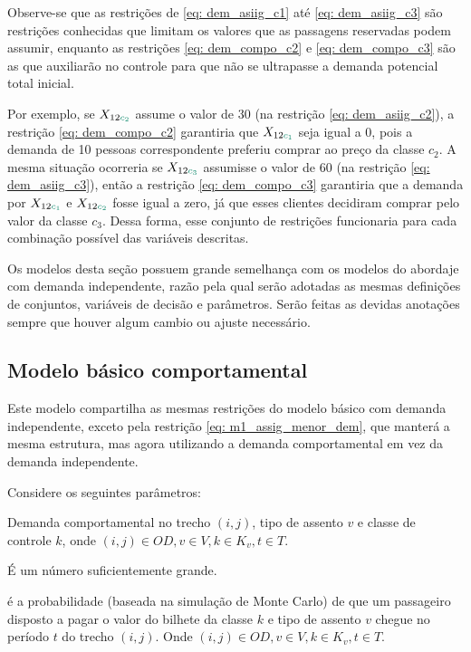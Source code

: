 Observe-se que as restrições de \eqref{eq: dem_asiig_c1} até \eqref{eq: dem_asiig_c3} são restrições conhecidas que limitam os valores que as passagens reservadas podem assumir, enquanto as restrições \eqref{eq: dem_compo_c2} e \eqref{eq: dem_compo_c3} são as que auxiliarão no controle para que não se ultrapasse a demanda potencial total inicial.

Por exemplo, se $X_{12\textcolor[rgb]{0.0588, 0.5412, 0.4275}{c_2}}$ assume o valor de 30 (na restrição \ref{eq: dem_asiig_c2}), a restrição \eqref{eq: dem_compo_c2} garantiria que $X_{12\textcolor[rgb]{0.0588, 0.5412, 0.4275}{c_1}}$ seja igual a 0, pois a demanda de 10 pessoas correspondente preferiu comprar ao preço da classe $c_2$. A mesma situação ocorreria se $X_{12\textcolor[rgb]{0.0588, 0.5412, 0.4275}{c_3}}$ assumisse o valor de 60 (na restrição \ref{eq: dem_asiig_c3}), então a restrição \eqref{eq: dem_compo_c3} garantiria que a demanda por $X_{12\textcolor[rgb]{0.0588, 0.5412, 0.4275}{c_1}}$ e $X_{12\textcolor[rgb]{0.0588, 0.5412, 0.4275}{c_2}}$ fosse igual a zero, já que esses clientes decidiram comprar pelo valor da classe $c_3$. Dessa forma, esse conjunto de restrições funcionaria para cada combinação possível das variáveis descritas.

Os modelos desta seção possuem grande semelhança com os modelos do abordaje com demanda independente, razão pela qual serão adotadas as mesmas definições de conjuntos, variáveis de decisão e parâmetros. Serão feitas as devidas anotações sempre que houver algum cambio ou ajuste necessário.

\subsection{Modelo básico comportamental} 
Este modelo compartilha as mesmas restrições do modelo básico com demanda independente, exceto pela restrição \eqref{eq: m1_assig_menor_dem}, que manterá a mesma estrutura, mas agora utilizando a demanda comportamental em vez da demanda independente.

Considere os seguintes parâmetros:
\begin{description}[style=unboxed, leftmargin=2.5cm, labelindent=1.5cm]
	\setlength{\itemsep}{-2.2em} %
	\setlength{\parskip}{0em} %
	\item[$d'_{ijvkt}:$] Demanda comportamental no trecho $(i,j)$, tipo de assento $v$ e classe de controle $k$, onde $(i,j) \in OD,v \in V, k \in K_v, t \in T$.\\
	\item[$M:$] É um número suficientemente grande.\\
	\item[$\sigma_{ijvkt}:$] é a probabilidade (baseada na simulação de Monte Carlo) de que um passageiro disposto a pagar o valor do bilhete da classe $k$ e tipo de assento $v$ chegue no período $t$ do trecho $(i,j)$. Onde $(i,j) \in OD,v \in V, k \in K_v, t \in T$.
\end{description}

